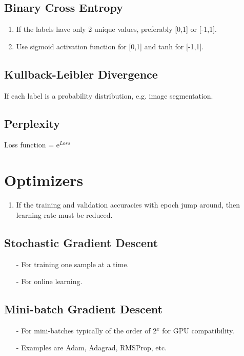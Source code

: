 \documentclass[a4paper, 12pt]{report}
\begin{document}
\section{Binary Cross Entropy}
\begin{enumerate}
\item If the labels have only 2 unique values, preferably [0,1] or [-1,1].
\item Use sigmoid activation function for [0,1] and tanh for [-1,1].
\end{enumerate}

\section{Kullback-Leibler Divergence}
If each label is a probability distribution, e.g. image segmentation.

\section{Perplexity}
Loss function = e$^{Loss}$
\chapter{Optimizers}
\begin{enumerate}
\item If the training and validation accuracies with epoch jump around, then learning rate must be reduced.
\end{enumerate}

\section{Stochastic Gradient Descent}
\begin{itemize}
\item[-] For training one sample at a time.

\item[-] For online learning.
\end{itemize}

\section{Mini-batch Gradient Descent}
\begin{itemize}
\item[-] For mini-batches typically of the order of 2$^x$ for GPU compatibility.
\item[-] Examples are Adam, Adagrad, RMSProp, etc.
\end{itemize}
\end{document}
